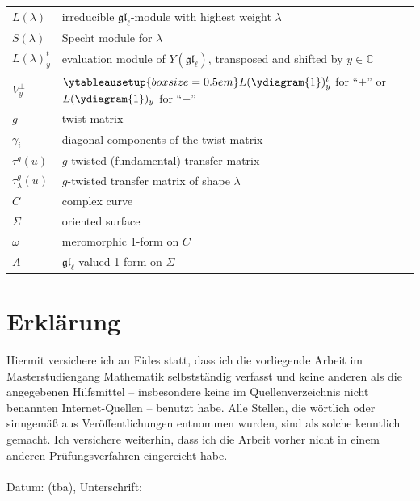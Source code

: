 \documentclass[11pt]{report}
\theoremstyle{definition}
\theoremstyle{remark}
\theoremstyle{remark}
\newcommand{\C}{\mathbb{C}}
\begin{document}
\begin{tabular}{l|l}
$L(\lambda)$ & irreducible $\mathfrak{gl}_\ell$-module with highest weight $\lambda$ \\
$S(\lambda)$ & Specht module for $\lambda$ \\
$L(\lambda)_y^t$ & evaluation module of $Y(\mathfrak{gl}_\ell)$, transposed and shifted by $y \in \C$ \\
$V_y^\pm$ & $\ytableausetup{boxsize=0.5em}L(\ydiagram{1})_y^t$ for “$+$” or $L(\ydiagram{1})_y$ for “$-$” \\
$g$ & twist matrix \\
$\gamma_i$ & diagonal components of the twist matrix \\
$\tau^g(u)$ & $g$-twisted (fundamental) transfer matrix \\
$\tau_\lambda^g(u)$ & $g$-twisted transfer matrix of shape $\lambda$ \\
$C$ & complex curve \\
$\Sigma$ & oriented surface \\
$\omega$ & meromorphic 1-form on $C$ \\
$A$ & $\mathfrak{gl}_\ell$-valued 1-form on $\Sigma$
\end{tabular}

\pagebreak

\printindex




\pagebreak

\section*{Erklärung}

Hiermit versichere ich an Eides statt, dass ich die vorliegende Arbeit im Masterstudiengang Mathematik selbstständig verfasst und keine anderen als die angegebenen Hilfsmittel – insbesondere keine im Quellenverzeichnis nicht benannten Internet-Quellen – benutzt habe. Alle Stellen, die wörtlich oder sinngemäß aus Veröffentlichungen entnommen wurden, sind als solche kenntlich gemacht. Ich versichere weiterhin, dass ich die Arbeit vorher nicht in einem anderen Prüfungsverfahren eingereicht habe.
~\\~\\
Datum: (tba), Unterschrift:

\end{document}
